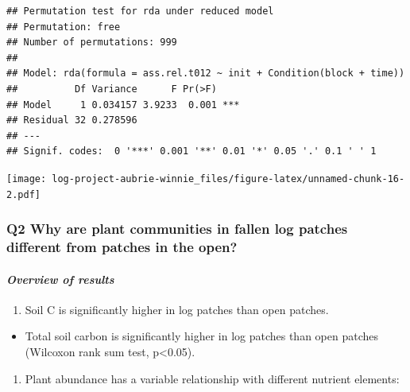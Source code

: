 \documentclass[
]{article}
\providecommand{\tightlist}{%
  \setlength{\itemsep}{0pt}\setlength{\parskip}{0pt}}
\begin{document}
\begin{verbatim}
## Permutation test for rda under reduced model
## Permutation: free
## Number of permutations: 999
## 
## Model: rda(formula = ass.rel.t012 ~ init + Condition(block + time))
##          Df Variance      F Pr(>F)    
## Model     1 0.034157 3.9233  0.001 ***
## Residual 32 0.278596                  
## ---
## Signif. codes:  0 '***' 0.001 '**' 0.01 '*' 0.05 '.' 0.1 ' ' 1
\end{verbatim}

\texttt{[image: log-project-aubrie-winnie\_files/figure-latex/unnamed-chunk-16-2.pdf]}

\hypertarget{q2-why-are-plant-communities-in-fallen-log-patches-different-from-patches-in-the-open}{%
\subsubsection{\texorpdfstring{\textbf{Q2 Why are plant communities in
fallen log patches different from patches in the
open?}}{Q2 Why are plant communities in fallen log patches different from patches in the open? }}\label{q2-why-are-plant-communities-in-fallen-log-patches-different-from-patches-in-the-open}}

\hypertarget{overview-of-results-1}{%
\paragraph{\texorpdfstring{\emph{Overview of results}
}{Overview of results  }}\label{overview-of-results-1}}

\begin{enumerate}
\def\labelenumi{\arabic{enumi}.}
\tightlist
\item
  Soil C is significantly higher in log patches than open patches.
\end{enumerate}

\begin{itemize}
\tightlist
\item
  Total soil carbon is significantly higher in log patches than open
  patches (Wilcoxon rank sum test, p\textless0.05).
\end{itemize}

\begin{enumerate}
\def\labelenumi{\arabic{enumi}.}
\setcounter{enumi}{1}
\tightlist
\item
  Plant abundance has a variable relationship with different nutrient
  elements:
\end{enumerate}
\end{document}
